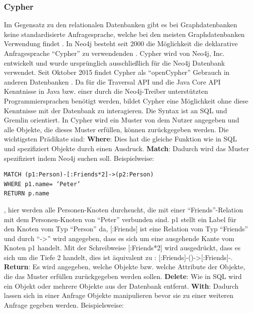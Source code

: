 \subsubsection{Cypher}
Im Gegensatz zu den relationalen Datenbanken gibt es bei Graphdatenbanken keine standardisierte Anfragesprache, welche bei den meisten Graphdatenbanken Verwendung findet \parencite{han2011survey}. In Neo4j besteht seit 2000 die Möglichkeit die deklarative Anfragesprache “Cypher” zu verwendenden  \parencite{francis2018cypher}. Cypher wird von Neo4j, Inc. entwickelt und wurde ursprünglich ausschließlich für die Neo4j Datenbank verwendet. Seit Oktober 2015  findet Cypher als “openCypher” Gebrauch in anderen Datenbanken \parencite{francis2018cypher}. Da für die Traversal API und die Java Core API Kenntnisse in Java bzw. einer durch die Neo4j-Treiber unterstützten Programmiersprachen benötigt werden, bildet Cypher eine Möglichkeit ohne diese Kenntnisse mit der Datenbank zu interagieren\parencite{vukotic2015neo4j}. Die Syntax ist an SQL und Gremlin orientiert. In Cypher wird ein Muster von dem Nutzer angegeben und alle Objekte, die dieses Muster erfüllen, können zurückgegeben werden. Die wichtigsten  Prädikate sind: \newline
\textbf{Where}: Dies hat die gleiche Funktion wie in SQL und spezifiziert Objekte durch einen Ausdruck. \newline
\textbf{Match}: Dadurch wird das Muster spezifiziert indem Neo4j suchen soll. Beispielweise: 
\begin{Verbatim}[frame=single]
MATCH (p1:Person)-[:Friends*2]->(p2:Person) 
WHERE p1.name= ‘Peter’ 
RETURN p.name
\end{Verbatim}
, hier werden alle Personen-Knoten durchsucht, die mit einer “Friends”-Relation mit dem Personen-Knoten von “Peter” verbunden sind. p1 stellt ein Label für den Knoten vom Typ “Person” da, [:Friends] ist eine Relation vom Typ “Friends” und durch “->” wird angegeben, dass es sich um eine ausgehende Kante vom Knoten p1 handelt. Mit der Schreibweise [:Friends*2] wird ausgedrückt, dass es sich um die Tiefe 2 handelt, dies ist äquivalent zu : [:Friends]-()->[:Friends]-. \newline
\textbf{Return}: Es wird angegeben, welche Objekte bzw. welche Attribute der Objekte, die das Muster erfüllen zurückgegeben werden sollen.\newline
\textbf{Delete}: Wie in SQL  wird ein Objekt  oder mehrere Objekte aus der Datenbank entfernt.\newline
\textbf{With}: Dadurch lassen sich in einer Anfrage Objekte manipulieren bevor sie zu einer weiteren Anfrage gegeben werden. Beispielsweise:
